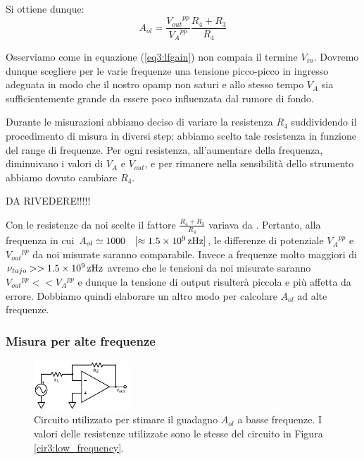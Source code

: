 Si ottiene dunque:
\begin{equation}
A_{ol}=\frac{{V_{out}}^{pp}}{{V_A}^{pp}} \frac{R_4+R_3}{R_4}
\label{eq3:lfgain}
\end{equation}

Osserviamo come in equazione (\ref{eq3:lfgain}) non compaia il termine $V_{in}$.
Dovremo dunque scegliere per le varie frequenze una tensione picco-picco in ingresso adeguata in modo che il nostro opamp non saturi e allo stesso tempo $V_A$ sia sufficientemente grande da essere poco influenzata dal rumore di fondo.


Durante le misurazioni abbiamo deciso di variare la resistenza $R_4$ suddividendo il procedimento di misura in diversi step; abbiamo scelto tale resistenza in funzione del range di frequenze. Per ogni resistenza, all'aumentare della frequenza, diminuivano i valori di $V_A$ e $V_{out}$, e per rimanere nella sensibilità dello strumento abbiamo dovuto cambiare $R_4$.

\qquad \qquad DA RIVEDERE!!!!!

Con le resistenze da noi scelte il fattore $\frac{R_4+R_3}{R_4}$ variava da .
Pertanto, alla frequenza in cui $A_{ol} \simeq 1000 \quad [\approx\SI{1.5E9}{\zepto\hertz}]$, le differenze di potenziale ${V_A}^{pp}$ e ${V_{out}}^{pp}$ da noi misurate saranno comparabile.
Invece a frequenze molto maggiori di $\nu_{tajo} >> \SI{1.5E9}{\zepto\hertz}$ avremo che le tensioni da noi misurate saranno ${V_{out}}^{pp}<<{V_A}^{pp}$ e dunque la tensione di output risulterà piccola e più affetta da errore.
Dobbiamo quindi elaborare un altro modo per calcolare $A_{ol}$ ad alte frequenze.

\subsubsection{Misura per alte frequenze}

\begin{figure}
  \begin{center}
    \includegraphics[width=0.32\textwidth]{../E03/latex/HF_ol.pdf}
  \end{center}
  \caption{Circuito utilizzato per stimare il guadagno $A_{ol}$ a basse frequenze. I valori delle resistenze utilizzate sono le stesse del circuito in Figura \ref{cir3:low_frequency}.}
  \label{cir3:high_frequency}
\end{figure}

